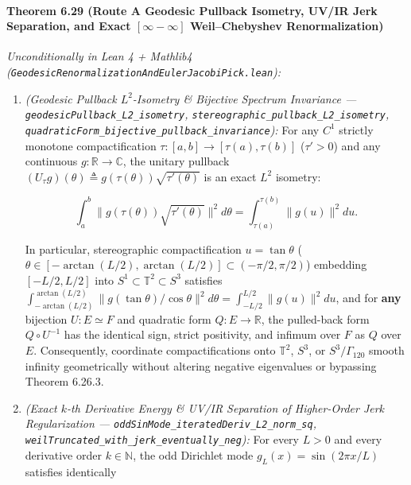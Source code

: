 \documentclass[
  11pt,
]{article}
\begin{document}
\paragraph{\texorpdfstring{Theorem 6.29 (Route A Geodesic Pullback
Isometry, UV/IR Jerk Separation, and Exact \([\infty - \infty]\)
Weil--Chebyshev
Renormalization)}{Theorem 6.29 (Route A Geodesic Pullback Isometry, UV/IR Jerk Separation, and Exact {[}\textbackslash infty - \textbackslash infty{]} Weil--Chebyshev Renormalization)}}\label{theorem-6.29-route-a-geodesic-pullback-isometry-uvir-jerk-separation-and-exact-infty---infty-weilchebyshev-renormalization}

\emph{Unconditionally in Lean 4 + Mathlib4
(\texttt{GeodesicRenormalizationAndEulerJacobiPick.lean}):}

\begin{enumerate}
\def\labelenumi{\arabic{enumi}.}
\item
  \emph{(Geodesic Pullback \(L^2\)-Isometry \& Bijective Spectrum
  Invariance --- \texttt{geodesicPullback\_L2\_isometry},
  \texttt{stereographic\_pullback\_L2\_isometry},
  \texttt{quadraticForm\_bijective\_pullback\_invariance}):} For any
  \(C^1\) strictly monotone compactification
  \(\tau : [a, b] \to [\tau(a), \tau(b)]\) (\(\tau' > 0\)) and any
  continuous \(g : \mathbb{R} \to \mathbb{C}\), the unitary pullback
  \((U_\tau g)(\theta) \triangleq g(\tau(\theta))\sqrt{\tau'(\theta)}\)
  is an exact \(L^2\) isometry:

  \[\int_a^b \big\|g(\tau(\theta))\sqrt{\tau'(\theta)}\big\|^2 d\theta = \int_{\tau(a)}^{\tau(b)} \|g(u)\|^2 du.\]

  In particular, stereographic compactification \(u = \tan\theta\)
  (\(\theta \in [-\arctan(L/2), \arctan(L/2)] \subset (-\pi/2, \pi/2)\))
  embedding \([-L/2, L/2]\) into
  \(S^1 \subset \mathbb{T}^2 \subset S^3\) satisfies
  \(\int_{-\arctan(L/2)}^{\arctan(L/2)} \|g(\tan\theta)/\cos\theta\|^2 d\theta = \int_{-L/2}^{L/2} \|g(u)\|^2 du\),
  and for \textbf{any} bijection \(U : E \simeq F\) and quadratic form
  \(Q : E \to \mathbb{R}\), the pulled-back form \(Q \circ U^{-1}\) has
  the identical sign, strict positivity, and infimum over \(F\) as \(Q\)
  over \(E\). Consequently, coordinate compactifications onto
  \(\mathbb{T}^2\), \(S^3\), or \(S^3/\Gamma_{120}\) smooth infinity
  geometrically without altering negative eigenvalues or bypassing
  Theorem 6.26.3.
\item
  \emph{(Exact \(k\)-th Derivative Energy \& UV/IR Separation of
  Higher-Order Jerk Regularization ---
  \texttt{oddSinMode\_iteratedDeriv\_L2\_norm\_sq},
  \texttt{weilTruncated\_with\_jerk\_eventually\_neg}):} For every
  \(L > 0\) and every derivative order \(k \in \mathbb{N}\), the odd
  Dirichlet mode \(g_L(x) = \sin(2\pi x / L)\) satisfies identically


\end{enumerate}
\end{document}
